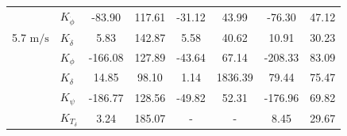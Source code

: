 \begin{table}[]
\begin{tabular}{llcccccc}
                                                   & $K_{\dot{\phi}} $                                                  & -83.90                                      & 117.61                                              & -31.12                                      & 43.99                                               & -76.30                                      & 47.12                                               \\
    \multirow{-2}{*}{5.7 $\si{\meter\per\second}$} & $K_{\dot{\delta}}$                                                 & 5.83                                        & 142.87                                              & 5.58                                        & 40.62                                               & 10.91                                       & 30.23                                               \\
                                                   & $K_{\phi} $                                                        & -166.08                                     & 127.89                                              & -43.64                                      & 67.14                                               & -208.33                                     & 83.09                                               \\
                                                   & $K_\delta $                                                        & 14.85                                       & 98.10                                               & 1.14                                        & 1836.39                                             & 79.44                                       & 75.47                                               \\
                                                   & $K_\psi $                                                          & -186.77                                     & 128.56                                              & -49.82                                      & 52.31                                               & -176.96                                     & 69.82                                               \\
                                                   & $K_{T_\delta}$                                                     & 3.24                                        & 185.07                                              & -                                           & -                                                   & 8.45                                        & 29.67                                               \\ \cline{2-8} 

\end{tabular}
\end{table}
